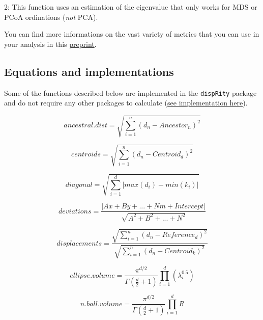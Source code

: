 \documentclass[
]{book}
\begin{document}
2: This function uses an estimation of the eigenvalue that only works for MDS or PCoA ordinations (\emph{not} PCA).

You can find more informations on the vast variety of metrics that you can use in your analysis in this \href{https://www.biorxiv.org/content/10.1101/801571v1}{preprint}.

\hypertarget{equations-and-implementations}{%
\subsection{Equations and implementations}\label{equations-and-implementations}}

Some of the functions described below are implemented in the \texttt{dispRity} package and do not require any other packages to calculate (\href{https://github.com/TGuillerme/dispRity/blob/master/R/dispRity.metric.R}{see implementation here}).

\begin{equation}
    ancestral.dist = \sqrt{\sum_{i=1}^{n}{({d}_{n}-Ancestor_{n})^2}}
\end{equation}

\begin{equation}
    centroids = \sqrt{\sum_{i=1}^{n}{({d}_{n}-Centroid_{d})^2}}
\end{equation}

\begin{equation}
    diagonal = \sqrt{\sum_{i=1}^{d}|max(d_i) - min(k_i)|}
\end{equation}

\begin{equation}
    deviations = \frac{|Ax + By + ... + Nm + Intercept|}{\sqrt{A^2 + B^2 + ... + N^2}}
\end{equation}

\begin{equation}
    displacements = \frac{\sqrt{\sum_{i=1}^{n}{({d}_{n}-Reference_{d})^2}}}{\sqrt{\sum_{i=1}^{n}{({d}_{n}-Centroid_{k})^2}}}
\end{equation}

\begin{equation}
    ellipse.volume = \frac{\pi^{d/2}}{\Gamma(\frac{d}{2}+1)}\displaystyle\prod_{i=1}^{d} (\lambda_{i}^{0.5})
\end{equation}

\begin{equation}
    n.ball.volume = \frac{\pi^{d/2}}{\Gamma(\frac{d}{2}+1)}\displaystyle\prod_{i=1}^{d} R
\end{equation}
\end{document}
